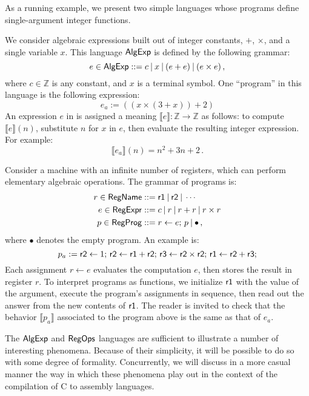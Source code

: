{\color{gray} %

As a running example,
we present two simple languages
whose programs define single-argument integer functions.

\begin{example}[$\kw{AlgExp}$] %
We consider algebraic expressions
built out of integer constants, $+$, $\times$,
and a single variable $x$.
This language $\kw{AlgExp}$ is defined by the following grammar:
\[
  e \in  \mathsf{AlgExp}  ::= c \:|\: x \:|\: (e + e) \:|\: (e \times e) \,,
\]
where $c \in \mathbb{Z}$ is any constant,
and $x$ is a terminal symbol.
One ``program'' in this language is the following expression:
\[
  e_a := ((x \times (3 + x)) + 2)
\]
An expression $e$ in  is assigned a meaning
$\llbracket e \rrbracket : \mathbb{Z} \rightarrow \mathbb{Z}$
as follows:
to compute $\llbracket e \rrbracket(n)$,
substitute $n$ for $x$ in $e$,
then evaluate the resulting integer expression.
For example:
\[
  \llbracket e_a \rrbracket (n) = n^2 + 3n + 2 \,.
\]
\end{example}

\begin{example}[$\kw{RegProg}$] %
Consider a machine with an infinite number of registers,
which can perform elementary algebraic operations.
The grammar of programs is:
\begin{align*}
  r \in  \mathsf{RegName}  &::=  \mathsf{r1}  \:|\:  \mathsf{r2}  \:|\: \cdots \\
  e \in  \mathsf{RegExpr}  &::= c \:|\: r \:|\: r + r \:|\: r \times r \\
  p \in  \mathsf{RegProg}  &::= r \leftarrow e; \, p \:|\: \bullet \,,
\end{align*}
where $\bullet$ denotes the empty program.
An example is:
\[
  p_a :=
   \mathsf{r2}  \leftarrow 1; \,
   \mathsf{r2}  \leftarrow  \mathsf{r1}  +  \mathsf{r2} ; \,
   \mathsf{r3}  \leftarrow  \mathsf{r2}  \times  \mathsf{r2} ; \,
   \mathsf{r1}  \leftarrow  \mathsf{r2}  +  \mathsf{r3} ;
\]
Each assignment $r \leftarrow e$ evaluates the computation $e$,
then stores the result in register $r$.
To interpret programs as functions,
we initialize $ \mathsf{r1} $ with the value of the argument,
execute the program's assignments in sequence,
then read out the answer from the new contents of $ \mathsf{r1} $.
The reader is invited to check that
the behavior $\llbracket p_a \rrbracket$ associated to the program above
is the same as that of $e_a$.
\end{example}

The $\kw{AlgExp}$ and $ \mathsf{RegOps} $ languages
are sufficient to illustrate a number of interesting phenomena.
Because of their simplicity,
it will be possible to do so with some degree of formality.
Concurrently,
we will discuss in a more casual manner
the way in which these phenomena play out
in the context of the compilation of C to assembly languages.

} %

